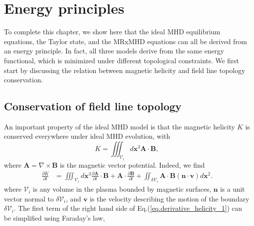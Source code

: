 \documentclass[my_thesis.tex]{subfiles}
\begin{document}
\section{Energy principles}\label{sec.energy principle}
To complete this chapter, we show here that the ideal MHD equilibrium equations, the Taylor state, and the MRxMHD equations can all be derived from an energy principle. In fact, all three models derive from the same energy functional, which is minimized under different topological constraints. We first start by discussing the relation between magnetic helicity and field line topology conservation.

\subsection{Conservation of field line topology}
An important property of the ideal MHD model is that the magnetic helicity $K$ is conserved everywhere under ideal MHD evolution, with
\begin{equation}
	K = \iiint_{\mathcal{V}_i} d\mathbf{x}^3 \mathbf{A} \cdot \mathbf{B},
\end{equation}
where $\mathbf{A}=\nabla\times\mathbf{B}$ is the magnetic vector potential. Indeed, we find
\begin{align}
	\frac{\partial K}{\partial t} &= \iiint_{\mathcal{V}_i} d\mathbf{x}^3 \frac{\partial\mathbf{A}}{\partial t}\cdot\mathbf{B} + \mathbf{A}\cdot\frac{\partial \mathbf{B}}{\partial t} + \iint_{\delta\mathcal{V}_i} \mathbf{A}\cdot\mathbf{B}(\mathbf{n}\cdot\mathbf{v})d\mathbf{x}^2. \label{eq.derivative_helicity_1}
\end{align}
where $\mathcal{V}_i$ is any volume in the plasma bounded by magnetic surfaces, $\mathbf{n}$ is a unit vector normal to $\delta \mathcal{V}_i$, and $\mathbf{v}$ is the velocity describing the motion of the boundary $\delta\mathcal{V}_i$. The first term of the right hand side of Eq.(\ref{eq.derivative_helicity_1}) can be simplified using Faraday's law,
\end{document}
